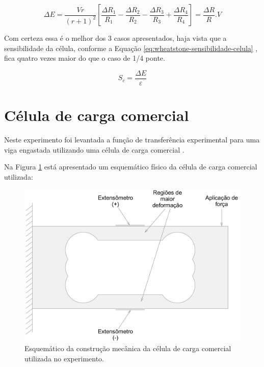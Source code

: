 \documentclass[a4paper]{instrumentacao}
\begin{document}
\begin{equation}
	\Delta E=\frac{V r}{(r+1)^2}\left [ \frac{\Delta R_1}{R_1}-\frac{\Delta R_2}{R_2}-\frac{\Delta R_3}{R_3}+\frac{\Delta R_4}{R_4} \right ]=\frac{\Delta R}{R}.V
	\label{eq:wheatstone-deltaE-completa}
\end{equation}

Com certeza essa é o melhor dos 3 casos apresentados, haja vista que a sensibilidade da célula, conforme a Equação \ref{eq:wheatstone-sensibilidade-celula} , fica quatro vezes maior do que o caso de 1/4 ponte.

\begin{equation}
	S_c=\frac{\Delta E}{\varepsilon}
	\label{eq:wheatstone-sensibilidade-celula}
\end{equation}

\section{Célula de carga comercial}

Neste experimento foi levantada a função de transferência experimental para uma viga engastada utilizando uma célula de carga comercial .

Na Figura \ref{fig:celula-comercial-esquema-fisico} está apresentado um esquemático físico da célula de carga comercial utilizada:

\begin{figure}[H]
\center
\includegraphics[width=\textwidth]{CelulaComercial.pdf}
\caption{Esquemático da construção mecânica da célula de carga comercial utilizada no experimento.}
\label{fig:celula-comercial-esquema-fisico}
\end{figure}
\end{document}
